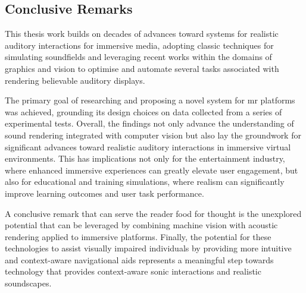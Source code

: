 \subsection{Conclusive Remarks}
This thesis work builds on decades of advances toward systems for realistic auditory interactions for immersive media, adopting classic techniques for simulating soundfields and leveraging recent works within the domains of graphics and vision to optimise and automate several tasks associated with rendering believable auditory displays.\par
The primary goal of researching and proposing a novel system for \acrshort{mr} platforms was achieved, grounding its design choices on data collected from a series of experimental tests. Overall, the findings not only advance the understanding of sound rendering integrated with computer vision but also lay the groundwork for significant advances toward realistic auditory interactions in immersive virtual environments. This has implications not only for the entertainment industry, where enhanced immersive experiences can greatly elevate user engagement, but also for educational and training simulations, where realism can significantly improve learning outcomes and user task performance.\par
A conclusive remark that can serve the reader food for thought is the unexplored potential that can be leveraged by combining machine vision with acoustic rendering applied to immersive platforms. Finally, the potential for these technologies to assist visually impaired individuals by providing more intuitive and context-aware navigational aids represents a meaningful step towards technology that provides context-aware sonic interactions and realistic soundscapes.
